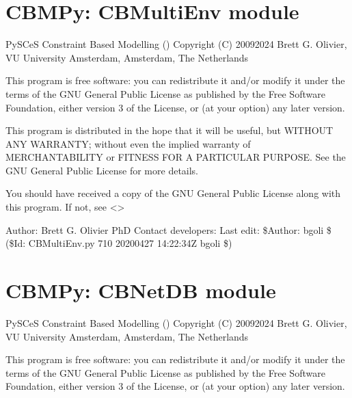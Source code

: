 \documentclass[letterpaper,10pt,english]{sphinxmanual}
\begin{document}
\section{CBMPy: CBMultiEnv module}
\label{\detokenize{modules_doc:cbmpy-cbmultienv-module}}
\sphinxAtStartPar
PySCeS Constraint Based Modelling ()
Copyright (C) 2009\sphinxhyphen{}2024 Brett G. Olivier, VU University Amsterdam, Amsterdam, The Netherlands

\sphinxAtStartPar
This program is free software: you can redistribute it and/or modify
it under the terms of the GNU General Public License as published by
the Free Software Foundation, either version 3 of the License, or
(at your option) any later version.

\sphinxAtStartPar
This program is distributed in the hope that it will be useful,
but WITHOUT ANY WARRANTY; without even the implied warranty of
MERCHANTABILITY or FITNESS FOR A PARTICULAR PURPOSE.  See the
GNU General Public License for more details.

\sphinxAtStartPar
You should have received a copy of the GNU General Public License
along with this program.  If not, see \textless{}\textgreater{}

\sphinxAtStartPar
Author: Brett G. Olivier PhD
Contact developers: 
Last edit: \$Author: bgoli \$ (\$Id: CBMultiEnv.py 710 2020\sphinxhyphen{}04\sphinxhyphen{}27 14:22:34Z bgoli \$)
\label{\detokenize{modules_doc:module-cbmpy.CBNetDB}}

\section{CBMPy: CBNetDB module}
\label{\detokenize{modules_doc:cbmpy-cbnetdb-module}}
\sphinxAtStartPar
PySCeS Constraint Based Modelling ()
Copyright (C) 2009\sphinxhyphen{}2024 Brett G. Olivier, VU University Amsterdam, Amsterdam, The Netherlands

\sphinxAtStartPar
This program is free software: you can redistribute it and/or modify
it under the terms of the GNU General Public License as published by
the Free Software Foundation, either version 3 of the License, or
(at your option) any later version.
\end{document}

